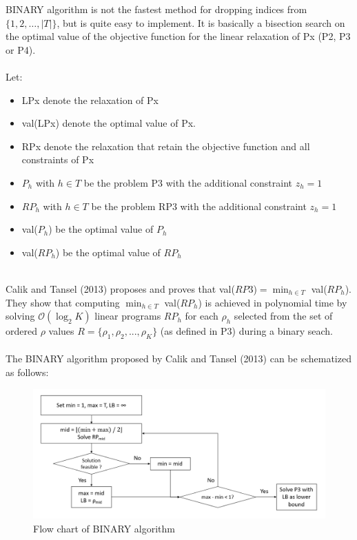 BINARY algorithm is not the fastest method for dropping indices from $\{1, 2, \ldots, |T|\}$, but is quite easy to implement.
It is basically a bisection search on the optimal value of the objective function for the linear relaxation of Px (P2, P3 or P4).\\\\
Let:
\begin{itemize}
	\item LPx denote the relaxation of Px
	\item val(LPx) denote the optimal value of Px.
	\item RPx denote the relaxation that retain the objective function and all constraints of Px
	\item $P_h$ with $h \in T$ be the problem P3 with the additional constraint $z_h = 1$
	\item $RP_h$ with $h \in T$ be the problem RP3 with the additional constraint $z_h = 1$
	\item val($P_h$) be the optimal value of $P_h$
	\item val($RP_h$) be the optimal value of $RP_h$
\end{itemize}\ \\
Calik and Tansel (2013) proposes and proves that val($RP3$)$ = \min_{h \in T}$ val($RP_h$). They show that computing $\min_{h \in T}$ val($RP_h$) is achieved in polynomial time by solving $\mathcal{O}\left( \log_2 K \right)$ linear programs $RP_h$ for each $\rho_h$ selected from the set of ordered $\rho$ values $R = \lbrace \rho_1, \rho_2, ..., \rho_K \rbrace$ (as defined in P3) during a binary seach.\\\\
The BINARY algorithm proposed by Calik and Tansel (2013) can be schematized as follows:
\begin{figure}[h!]
	\begin{center}
		\includegraphics[width=\textwidth]{../imgs/BINARY.png}\\
		Flow chart of BINARY algorithm
	\end{center}
\end{figure}
